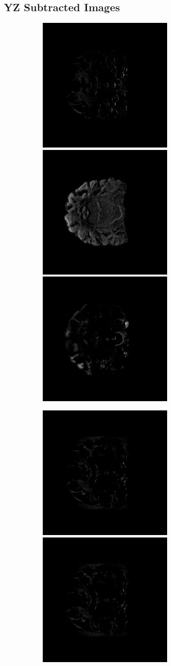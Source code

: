 \documentclass[12pt, fleqn, titlepage]{article}
\newcommand\skipperer{0.45pt}
\newcommand\ripperer{1.25pt}
\begin{document}
\subsection{YZ Subtracted Images}\label{yz_subtracted_images}
\begin{figure}[H]
	\centering
	\begin{subfigure}[b]{0.8\textwidth}
		\centering
		\includegraphics[width=0.22\linewidth]{imgs/subtracted_images/yz/002_S_0559_xy_gts_comparison}
		\hskip\skipperer
		\includegraphics[width=0.22\linewidth]{imgs/subtracted_images/yz/082_S_0469_xy_gts_comparison}
		\hskip\skipperer
		\includegraphics[width=0.22\linewidth]{imgs/subtracted_images/yz/136_S_0196_xy_gts_comparison}
	\end{subfigure}
	\vskip\ripperer
	\begin{subfigure}[b]{0.8\textwidth}
		\centering
		\includegraphics[width=0.22\linewidth]{imgs/subtracted_images/yz/002_S_0559_xy_1.5_1.5gen_comparison}
		\hskip\skipperer
		\includegraphics[width=0.22\linewidth]{imgs/subtracted_images/yz/002_S_0559_xy_1.5_1.5gen_comparison}

\end{subfigure}
\end{figure}
\end{document}
